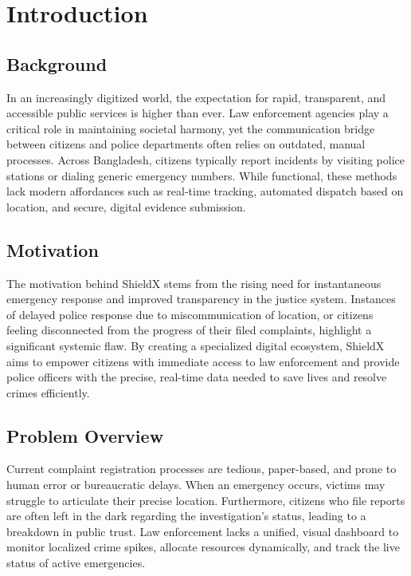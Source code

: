 \documentclass[12pt, a4paper, twoside, openany]{report}
\begin{document}
\chapter{Introduction}
\section{Background}
In an increasingly digitized world, the expectation for rapid, transparent, and accessible public services is higher than ever. Law enforcement agencies play a critical role in maintaining societal harmony, yet the communication bridge between citizens and police departments often relies on outdated, manual processes. Across Bangladesh, citizens typically report incidents by visiting police stations or dialing generic emergency numbers. While functional, these methods lack modern affordances such as real-time tracking, automated dispatch based on location, and secure, digital evidence submission.
\section{Motivation}
The motivation behind ShieldX stems from the rising need for instantaneous emergency response and improved transparency in the justice system. Instances of delayed police response due to miscommunication of location, or citizens feeling disconnected from the progress of their filed complaints, highlight a significant systemic flaw. By creating a specialized digital ecosystem, ShieldX aims to empower citizens with immediate access to law enforcement and provide police officers with the precise, real-time data needed to save lives and resolve crimes efficiently.
\section{Problem Overview}
Current complaint registration processes are tedious, paper-based, and prone to human error or bureaucratic delays. When an emergency occurs, victims may struggle to articulate their precise location. Furthermore, citizens who file reports are often left in the dark regarding the investigation's status, leading to a breakdown in public trust. Law enforcement lacks a unified, visual dashboard to monitor localized crime spikes, allocate resources dynamically, and track the live status of active emergencies.
\end{document}
